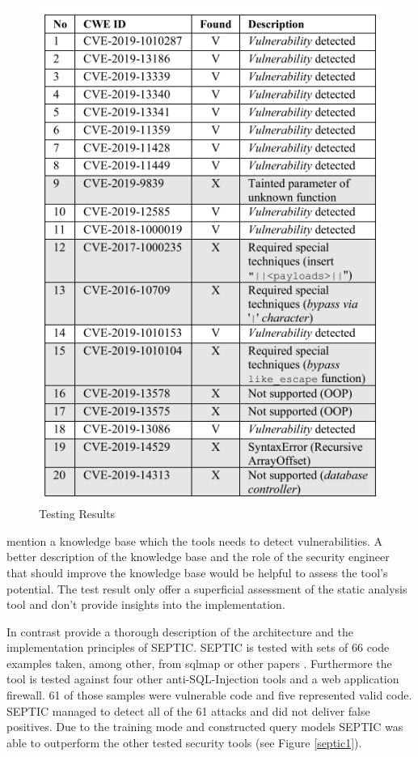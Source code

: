 \begin{figure}[H]
\centering
\includegraphics[scale=0.75]{static_experiment_table.PNG}
\caption{Testing Results \autocite[5]{Maskur2019}}
\end{figure}

\textcite[]{Maskur2019} mention a knowledge base which the tools needs to detect vulnerabilities. A better description of the knowledge base and the role of the security engineer that should improve the knowledge base would be helpful to assess the tool's potential. The test result only offer a superficial assessment of the static analysis tool and don't provide insights into the implementation.\newline  

In contrast \textcite[1170-1180]{Medeiros2019} provide a thorough description of the architecture and the implementation principles of SEPTIC. SEPTIC is tested with sets of 66 code examples taken, among other, from sqlmap \autocite[]{DameleA.G.2014} or other papers \autocite[]{Ray2012, Ray2014}. Furthermore the tool is tested against four other anti-SQL-Injection tools and a web application firewall. 61 of those samples were vulnerable code and five represented valid code. SEPTIC managed to detect all of the 61 attacks and did not deliver false positives. Due to the training mode and constructed query models SEPTIC was able to outperform the other tested security tools (see Figure \ref{septic1}).

